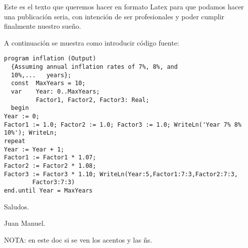 \documentclass[10pt,a4paper,twoside]{book}
\begin{document}
Este es el texto que queremos hacer en formato Latex para que podamos hacer una publicación seria, con intención de ser profesionales y poder cumplir finalmente nuestro sueño.

A continuación se muestra como introducir código fuente:

\begin{verbatim}
program inflation (Output)
  {Assuming annual inflation rates of 7%, 8%, and
  10%,...   years};
  const  MaxYears = 10;
  var    Year: 0..MaxYears;
         Factor1, Factor2, Factor3: Real;
  begin
Year := 0;
Factor1 := 1.0; Factor2 := 1.0; Factor3 := 1.0; WriteLn('Year 7% 8% 10%'); WriteLn;
repeat
Year := Year + 1;
Factor1 := Factor1 * 1.07;
Factor2 := Factor2 * 1.08;
Factor3 := Factor3 * 1.10; WriteLn(Year:5,Factor1:7:3,Factor2:7:3,
        Factor3:7:3)
end.until Year = MaxYears

\end{verbatim}

Saludos.

Juan Manuel.

NOTA: en este doc si se ven los acentos y las ñs.
\end{document}
